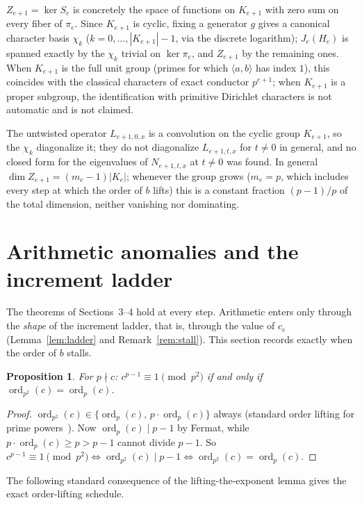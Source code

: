 \documentclass[11pt]{article}
\newtheorem{proposition}[theorem]{Proposition}
\theoremstyle{definition}
\theoremstyle{remark}
\newcommand{\ord}{\operatorname{ord}}
\begin{document}
$Z_{e+1}=\ker S_e$ is concretely the space of functions on $K_{e+1}$ with zero sum on every fiber of $\pi_e$. Since $K_{e+1}$ is cyclic, fixing a generator $g$ gives a canonical character basis $\chi_k$ ($k=0,\dots,|K_{e+1}|-1$, via the discrete logarithm); $J_e(H_e)$ is spanned exactly by the $\chi_k$ trivial on $\ker\pi_e$, and $Z_{e+1}$ by the remaining ones. When $K_{e+1}$ is the full unit group (primes for which $\langle a,b\rangle$ has index $1$), this coincides with the classical characters of exact conductor $p^{e+1}$; when $K_{e+1}$ is a proper subgroup, the identification with primitive Dirichlet characters is not automatic and is not claimed.

The untwisted operator $L_{e+1,0,x}$ is a convolution on the cyclic group $K_{e+1}$, so the $\chi_k$ diagonalize it; they do not diagonalize $L_{e+1,t,x}$ for $t\ne0$ in general, and no closed form for the eigenvalues of $N_{e+1,t,x}$ at $t\ne0$ was found. In general $\dim Z_{e+1}=(m_e-1)|K_e|$; whenever the group grows ($m_e=p$, which includes every step at which the order of $b$ lifts) this is a constant fraction $(p-1)/p$ of the total dimension, neither vanishing nor dominating.

\section{Arithmetic anomalies and the increment ladder}\label{sec:arith}

The theorems of Sections~3--4 hold at every step. Arithmetic enters only through the \emph{shape} of the increment ladder, that is, through the value of $c_e$ (Lemma~\ref{lem:ladder} and Remark~\ref{rem:stall}). This section records exactly when the order of $b$ stalls.

\begin{proposition}\label{prop:wieferich}
For $p\nmid c$: $c^{p-1}\equiv1\pmod{p^2}$ if and only if $\ord_{p^2}(c)=\ord_p(c)$.
\end{proposition}

\begin{proof}
$\ord_{p^2}(c)\in\{\ord_p(c),\,p\cdot\ord_p(c)\}$ always (standard order lifting for prime powers~\cite{IrelandRosen}). Now $\ord_p(c)\mid p-1$ by Fermat, while $p\cdot\ord_p(c)\ge p>p-1$ cannot divide $p-1$. So $c^{p-1}\equiv1\pmod{p^2}\iff\ord_{p^2}(c)\mid p-1\iff\ord_{p^2}(c)=\ord_p(c)$.
\end{proof}

The following standard consequence of the lifting-the-exponent lemma gives the exact order-lifting schedule.
\end{document}
